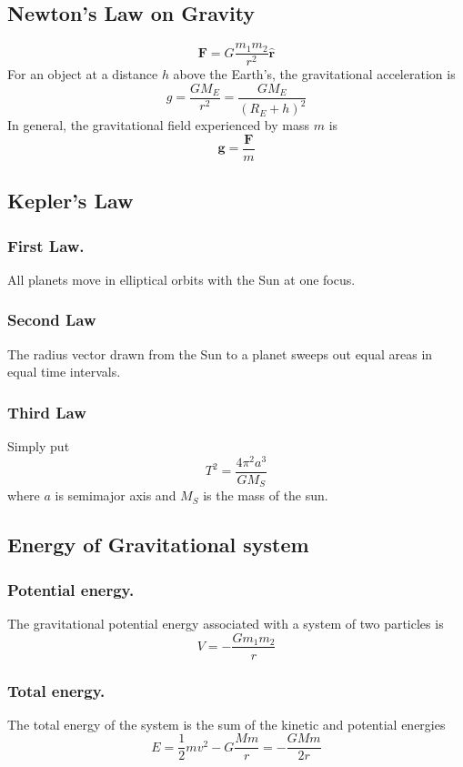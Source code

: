 \documentclass[../../../main.tex]{subfiles}
\begin{document}
\subsection*{Newton's Law on Gravity}
\begin{equation*}
    \mathbf{F}=G\frac{m_1m_2}{r^2}\mathbf{\hat{r}}
\end{equation*}
For an object at a distance $h$ above the Earth's, the gravitational acceleration is 
\begin{equation*}
    g=\frac{GM_E}{r^2}=\frac{GM_E}{(R_E+h)^2}
\end{equation*}
In general, the gravitational field experienced by mass $m$ is 
\begin{equation*}
    \mathbf{g}=\frac{\mathbf{F}}{m}
\end{equation*}


\subsection*{Kepler's Law}
\subsubsection*{First Law.} All planets move in elliptical orbits with the Sun at one focus.
\subsubsection*{Second Law} The radius vector drawn from the Sun to a planet sweeps out equal areas in equal time intervals.
\subsubsection*{Third Law} Simply put 
\begin{equation*}
    T^2=\frac{4\pi^2a^3}{GM_S}
\end{equation*}
where $a$ is semimajor axis and $M_S$ is the mass of the sun. 

\subsection*{Energy of Gravitational system}
\subsubsection*{Potential energy.} The gravitational potential energy associated with a system of two particles is
\begin{equation*}
    V=-\frac{Gm_1m_2}{r}
\end{equation*}
\subsubsection*{Total energy.} The total energy of the system is the sum
of the kinetic and potential energies
\begin{equation*}
    E=\frac{1}{2}mv^2-G\frac{Mm}{r}=-\frac{GMm}{2r}
\end{equation*}
\end{document}
